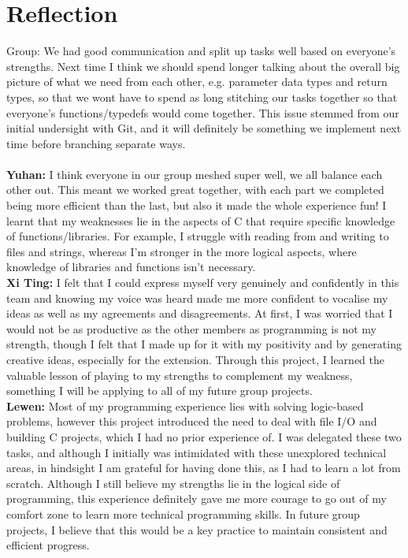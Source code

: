 \documentclass[11pt]{article}
\begin{document}
\section{Reflection}
Group:
We had good communication and split up tasks well based on everyone's strengths. Next time I think we should spend longer talking about the overall big picture of what we need from each other, e.g. parameter data types and return types, so that we wont have to spend as long stitching our tasks together so that everyone's functions/typedefs would come together. This issue stemmed from our initial undersight with Git, and it will definitely be something we implement next time before branching separate ways.\\\\
\textbf{Yuhan:} I think everyone in our group meshed super well, we all balance each other out. This meant we worked great together, with each part we completed being more efficient than the last, but also it made the whole experience fun! I learnt that my weaknesses lie in the aspects of C that require specific knowledge of functions/libraries. For example, I struggle with reading from and writing to files and strings, whereas I’m stronger in the more logical aspects, where knowledge of libraries and functions isn’t necessary. \\
\textbf{Xi Ting:} I felt that I could express myself very genuinely and confidently in this team and knowing my voice was heard made me more confident to vocalise my ideas as well as my agreements and disagreements.  At first, I was worried that I would not be as productive as the other members as programming is not my strength, though I felt that I made up for it with my positivity and by generating creative ideas, especially for the extension. Through this project, I learned the valuable lesson of playing to my strengths to complement my weakness, something I will be applying to all of my future group projects.\\
\textbf{Lewen:} Most of my programming experience lies with solving logic-based problems, however this project introduced the need to deal with file I/O and building C projects, which I had no prior experience of. I was delegated these two tasks, and although I initially was intimidated with these unexplored technical areas, in hindsight I am grateful for having done this, as I had to learn a lot from scratch. Although I still believe my strengths lie in the logical side of programming, this experience definitely gave me more courage to go out of my comfort zone to learn more technical programming skills. In future group projects, I believe that this would be a key practice to maintain consistent and efficient progress.\\
\end{document}
